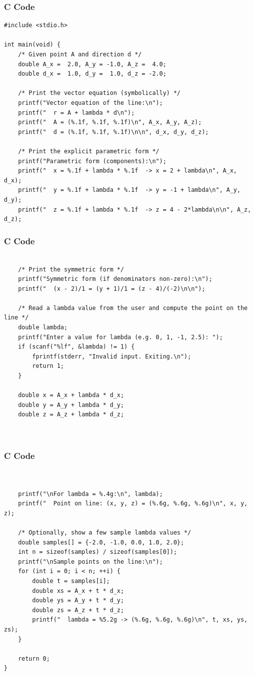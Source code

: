 \documentclass{beamer}
\begin{document}
\begin{frame}[fragile]
    \frametitle{C Code}
    \begin{lstlisting}
#include <stdio.h>

int main(void) {
    /* Given point A and direction d */
    double A_x =  2.0, A_y = -1.0, A_z =  4.0;
    double d_x =  1.0, d_y =  1.0, d_z = -2.0;

    /* Print the vector equation (symbolically) */
    printf("Vector equation of the line:\n");
    printf("  r = A + lambda * d\n");
    printf("  A = (%.1f, %.1f, %.1f)\n", A_x, A_y, A_z);
    printf("  d = (%.1f, %.1f, %.1f)\n\n", d_x, d_y, d_z);

    /* Print the explicit parametric form */
    printf("Parametric form (components):\n");
    printf("  x = %.1f + lambda * %.1f  -> x = 2 + lambda\n", A_x, d_x);
    printf("  y = %.1f + lambda * %.1f  -> y = -1 + lambda\n", A_y, d_y);
    printf("  z = %.1f + lambda * %.1f  -> z = 4 - 2*lambda\n\n", A_z, d_z);

    \end{lstlisting}
\end{frame}

\begin{frame}[fragile]
    \frametitle{C Code}
    \begin{lstlisting}

    /* Print the symmetric form */
    printf("Symmetric form (if denominators non-zero):\n");
    printf("  (x - 2)/1 = (y + 1)/1 = (z - 4)/(-2)\n\n");

    /* Read a lambda value from the user and compute the point on the line */
    double lambda;
    printf("Enter a value for lambda (e.g. 0, 1, -1, 2.5): ");
    if (scanf("%lf", &lambda) != 1) {
        fprintf(stderr, "Invalid input. Exiting.\n");
        return 1;
    }

    double x = A_x + lambda * d_x;
    double y = A_y + lambda * d_y;
    double z = A_z + lambda * d_z;

 

    \end{lstlisting}
\end{frame}

\begin{frame}[fragile]
    \frametitle{C Code}
    \begin{lstlisting}


    printf("\nFor lambda = %.4g:\n", lambda);
    printf("  Point on line: (x, y, z) = (%.6g, %.6g, %.6g)\n", x, y, z);

    /* Optionally, show a few sample lambda values */
    double samples[] = {-2.0, -1.0, 0.0, 1.0, 2.0};
    int n = sizeof(samples) / sizeof(samples[0]);
    printf("\nSample points on the line:\n");
    for (int i = 0; i < n; ++i) {
        double t = samples[i];
        double xs = A_x + t * d_x;
        double ys = A_y + t * d_y;
        double zs = A_z + t * d_z;
        printf("  lambda = %5.2g -> (%.6g, %.6g, %.6g)\n", t, xs, ys, zs);
    }

    return 0;
}



    \end{lstlisting}
\end{frame}
\end{document}
